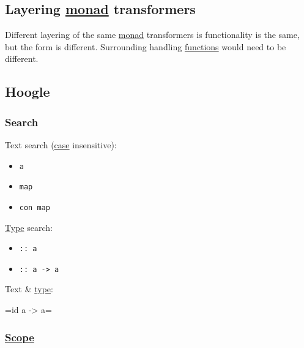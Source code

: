 \documentclass[11pt]{article}
\begin{document}
\subsection{Layering \hyperref[org86a5d95]{monad} transformers}
\label{sec:org3f8cbcc}

Different layering of the same \hyperref[org86a5d95]{monad} transformers is functionality is the same, but the form is different. Surrounding handling \hyperref[orgaa8fb87]{functions} would need to be different.\\

\subsection{Hoogle}
\label{sec:org73dce8b}

\subsubsection{Search}
\label{sec:org2d89720}

Text search (\hyperref[org41d12b6]{case} insensitive):\\
\begin{itemize}
\item \texttt{a}\\
\item \texttt{map}\\
\item \texttt{con map}\\
\end{itemize}

\hyperref[orgc4aea2f]{Type} search:\\
\begin{itemize}
\item \texttt{:: a}\\
\item \texttt{:: a -> a}\\
\end{itemize}

Text \& \hyperref[orgc4aea2f]{type}:\\
\begin{description}
\item{=id} a -> a=\\
\end{description}

\subsubsection{\hyperref[orgb3c0d1a]{Scope}}
\label{sec:orgd28040d}
\end{document}
